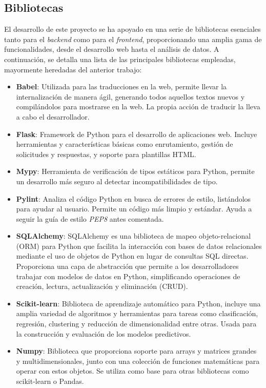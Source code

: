 \subsection{Bibliotecas}
El desarrollo de este proyecto se ha apoyado en una serie de bibliotecas esenciales tanto para el \textit{backend} como para el \textit{frontend}, proporcionando una amplia gama de funcionalidades, desde el desarrollo web hasta el análisis de datos. A continuación, se detalla una lista de las principales bibliotecas empleadas, mayormente heredadas del anterior trabajo:

\begin{itemize}
	\item \textbf{Babel}: Utilizada para las traducciones en la web, permite llevar la internalización de manera ágil, generando todos aquellos textos nuevos y compilándolos para mostrarse en la web. La propia acción de traducir la lleva a cabo el desarrollador.
	\item \textbf{Flask}: Framework de Python para el desarrollo de aplicaciones web. Incluye herramientas y características básicas como enrutamiento, gestión de solicitudes y respuestas, y soporte para plantillas HTML.
	\item \textbf{Mypy}: Herramienta de verificación de tipos estáticos para Python, permite un desarrollo más seguro al detectar incompatibilidades de tipo.
	\item \textbf{Pylint}: Analiza el código Python en busca de errores de estilo, listándolos para ayudar al usuario. Permite un código más limpio y estándar. Ayuda a seguir la guía de estilo \textit{PEP8} antes comentada.
	\item \textbf{SQLAlchemy}: SQLAlchemy es una biblioteca de mapeo objeto-relacional (ORM) para Python que facilita la interacción con bases de datos relacionales mediante el uso de objetos de Python en lugar de consultas SQL directas. Proporciona una capa de abstracción que permite a los desarrolladores trabajar con modelos de datos en Python, simplificando operaciones de creación, lectura, actualización y eliminación (CRUD).
	\item \textbf{Scikit-learn}: Biblioteca de aprendizaje automático para Python, incluye una amplia variedad de algoritmos y herramientas para tareas como clasificación, regresión, clustering y reducción de dimensionalidad entre otras. Usada para la construcción y evaluación de los modelos predictivos.
	\item \textbf{Numpy}: Biblioteca que proporciona soporte para arrays y matrices grandes y multidimensionales, junto con una colección de funciones matemáticas para operar con estos objetos. Se utiliza como base para otras bibliotecas como scikit-learn o Pandas.

\end{itemize}
